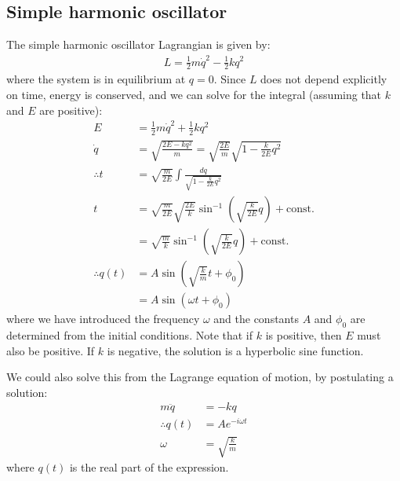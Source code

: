 \subsection{Simple harmonic oscillator}
The simple harmonic oscillator Lagrangian is given by:
\begin{align}
L=\frac{1}{2}m\dot q^2-\frac{1}{2}kq^2
\end{align}
where the system is in equilibrium at $q=0$. Since $L$ does not depend explicitly on time, energy is conserved, and we can solve for the integral (assuming that $k$ and $E$ are positive):
\begin{align}
E&=\frac{1}{2}m\dot q^2+\frac{1}{2}kq^2\nonumber\\
\dot q&=\sqrt{\frac{2E-kq^2}{m}}=\sqrt{\frac{2E}{m}}\sqrt{1-\frac{k}{2E}q^2}\nonumber\\
\therefore t&=\sqrt{\frac{m}{2E}}\int\frac{dq}{\sqrt{1-\frac{k}{2E}q^2}}\nonumber\\
t&=\sqrt{\frac{m}{2E}}\sqrt{\frac{2E}{k}}\sin^{-1}\left(\sqrt{\frac{k}{2E}}q\right)+\text{const.}\nonumber\\
&=\sqrt{\frac{m}{k}}\sin^{-1}\left(\sqrt{\frac{k}{2E}}q\right)+\text{const.}\nonumber\\
\therefore q(t)&=A\sin\left( \sqrt{\frac{k}{m}}t+\phi_0 \right)\nonumber\\
&=A\sin\left( \omega t+\phi_0 \right)
\end{align}
where we have introduced the frequency $\omega$ and the constants $A$ and $\phi_0$ are determined from the initial conditions. Note that if $k$ is positive, then $E$ must also be positive. If $k$ is negative, the solution is a hyperbolic sine function.

We could also solve this from the Lagrange equation of motion, by postulating a solution:
\begin{align}
m\ddot q &=-kq \nonumber\\
\therefore q(t) &= Ae^{-i\omega t}\nonumber\\
\omega&=\sqrt{\frac{k}{m}}
\end{align}
where $q(t)$ is the real part of the expression.

